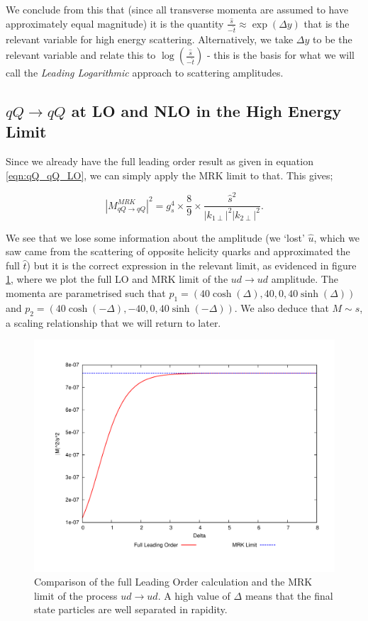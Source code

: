 We conclude from this that (since all transverse momenta are assumed to have approximately equal magnitude) it is the quantity $\frac{\hat{s}}{-\hat{t}} \approx \exp(\Delta y)$ that is the relevant variable for high energy scattering. Alternatively, we take $\Delta y$ to be the relevant variable and relate this to $\log(\frac{\hat{s}}{-\hat{t}})$ - this is the basis for what we will call the \emph{Leading Logarithmic} approach to scattering amplitudes. 

\subsection{$qQ \to qQ$ at LO and NLO in the High Energy Limit}

Since we already have the full leading order result as given in equation \ref{eqn:qQ_qQ_LO}, we can simply apply the MRK limit to that. This gives;

\begin{equation}
|M_{qQ\to qQ}^{MRK}|^2 = g_s^4 \times \frac{8}{9} \times \frac{\hat{s}^2}{|k_{1 \perp}|^2 |k_{2 \perp}|^2}.
\end{equation}

We see that we lose some information about the amplitude (we `lost' $\hat{u}$, which we saw came from the scattering of opposite helicity quarks and approximated the full $\hat{t}$) but it is the correct expression in the relevant limit, as evidenced in figure \ref{fig:qQ_LO_MRK}, where we plot the full LO and MRK limit of the $ud \to ud$ amplitude. The momenta are parametrised such that $p_1 =  \left(40 \cosh(\Delta), 40, 0, 40 \sinh(\Delta) \right)$ and $p_2 =  \left(40 \cosh(-\Delta), -40, 0, 40 \sinh(-\Delta) \right)$. We also deduce that $M \sim \hat{s}$, a scaling relationship that we will return to later.

\begin{figure}[t]
\centering
\includegraphics[scale=0.5]{Images/ud_ud_plots.pdf} 
\caption{Comparison of the full Leading Order calculation and the MRK limit of the process $ud \to ud$. A high value of $\Delta$ means that the final state particles are well separated in rapidity.}
\label{fig:qQ_LO_MRK}
\end{figure}

